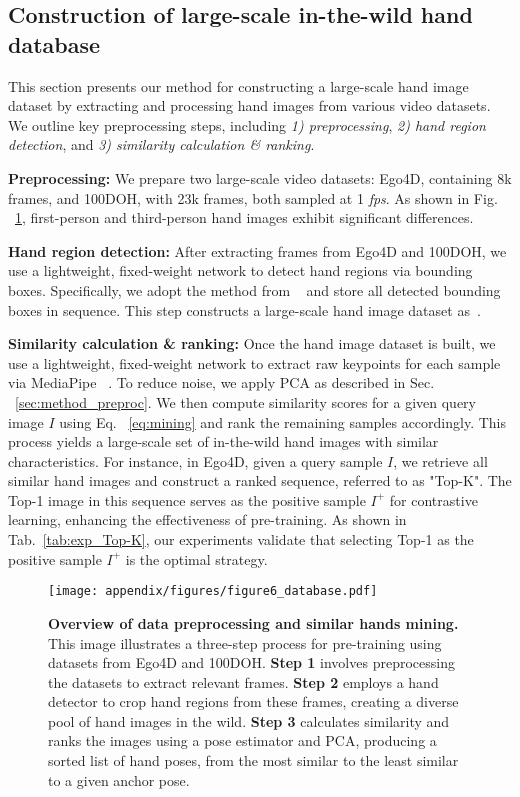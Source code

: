 \subsection{Construction of large-scale in-the-wild hand database}\label{sec:appendix_database}

This section presents our method for constructing a large-scale hand image dataset by extracting and processing hand images from various video datasets. We outline key preprocessing steps, including \textit{1) preprocessing}, \textit{2) hand region detection}, and \textit{3) similarity calculation \& ranking}.

\textbf{Preprocessing:} We prepare two large-scale video datasets: Ego4D, containing 8k frames, and 100DOH, with 23k frames, both sampled at 1 \textit{fps}. As shown in Fig. ~\ref{fig:database}, first-person and third-person hand images exhibit significant differences.

\textbf{Hand region detection:} After extracting frames from Ego4D and 100DOH, we use a lightweight, fixed-weight network to detect hand regions via bounding boxes. Specifically, we adopt the method from ~\citep{shan:cvpr20} and store all detected bounding boxes in sequence. This step constructs a large-scale hand image dataset as~\cite{tango:eccvw22}.

\textbf{Similarity calculation \& ranking:} Once the hand image dataset is built, we use a lightweight, fixed-weight network to extract raw keypoints for each sample via MediaPipe ~\citep{lugaresi:arxiv19}. To reduce noise, we apply PCA as described in Sec. ~\ref{sec:method_preproc}. We then compute similarity scores for a given query image \( I \) using Eq. ~\ref{eq:mining} and rank the remaining samples accordingly. This process yields a large-scale set of in-the-wild hand images with similar characteristics. For instance, in Ego4D, given a query sample \( I \), we retrieve all similar hand images and construct a ranked sequence, referred to as "Top-K". The Top-1 image in this sequence serves as the positive sample \( I^{+} \) for contrastive learning, enhancing the effectiveness of \Ours pre-training. As shown in Tab.~\ref{tab:exp_Top-K}, our experiments validate that selecting Top-1 as the positive sample \( I^{+} \) is the optimal strategy.  

\begin{figure}
    \begin{center}
    \texttt{[image: appendix/figures/figure6\_database.pdf]}
    \end{center}
    \vspace{-3mm}
    \caption{
    \textbf{Overview of data preprocessing and similar hands mining.} This image illustrates a three-step process for \Ours pre-training using datasets from Ego4D and 100DOH. \textbf{Step 1} involves preprocessing the datasets to extract relevant frames. \textbf{Step 2} employs a hand detector to crop hand regions from these frames, creating a diverse pool of hand images in the wild. \textbf{Step 3} calculates similarity and ranks the images using a pose estimator and PCA, producing a sorted list of hand poses, from the most similar to the least similar to a given anchor pose.
   }
    \label{fig:database}
\end{figure}